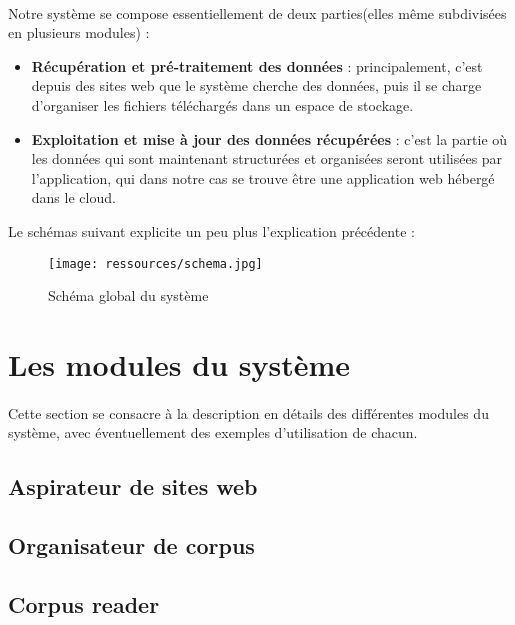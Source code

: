 \documentclass[]{report}
\begin{document}
		\paragraph{}
		Notre système se compose essentiellement de deux parties(elles même subdivisées en plusieurs modules) : 
		\begin{itemize}
			\item \textbf{Récupération et pré-traitement des données } : principalement, c'est depuis des sites web que le système 
			cherche des données, puis il se charge d'organiser les fichiers téléchargés dans un espace de stockage.
			\item \textbf{Exploitation et mise à jour des données récupérées} : c'est la partie où les données qui sont maintenant
			structurées et organisées seront utilisées par l'application, qui dans notre cas se trouve être une application web hébergé dans le cloud.
		\end{itemize}
		\par 
		Le schémas suivant explicite un peu plus l'explication précédente : 
		
		\begin{figure}[H]
			\centering
			\texttt{[image: ressources/schema.jpg]}
			\caption{Schéma global du système}
			
		\end{figure}
		
	\section{Les modules du système}
		\paragraph{}
		Cette section se consacre à la description en détails des différentes modules du système, avec éventuellement des exemples d'utilisation de chacun.
		\subsection{Aspirateur de sites web}
			\paragraph{}
		\subsection{Organisateur de corpus}
		\subsection{Corpus reader}
\end{document}
